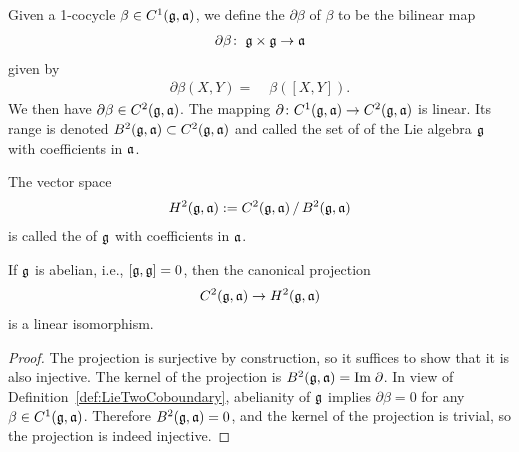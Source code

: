 \begin{definition}
  \label{def:LieTwoCoboundary}
  \leanok
  Given a 1-cocycle $\beta \in C^1(\mathfrak{g}, \mathfrak{a})$, we define the
   $\partial \beta$ of $\beta$ to be the bilinear map
  \begin{align*}
    \partial \beta \colon \; & \mathfrak{g} \times \mathfrak{g} \to \mathfrak{a} \\
  \end{align*}
  given by
  \begin{align*}
    \partial \beta (X, Y) = \; & \beta ([X,Y]) .
  \end{align*}
  We then have $\partial \beta \in C^2(\mathfrak{g},\mathfrak{a})$.
  The mapping $\partial \colon C^1(\mathfrak{g},\mathfrak{a}) \to C^2(\mathfrak{g},\mathfrak{a})$
  is linear. Its range is denoted $B^2(\mathfrak{g},\mathfrak{a}) \subset C^2(\mathfrak{g},\mathfrak{a})$
  and called the set of  of the Lie algebra $\mathfrak{g}$
  with coefficients in $\mathfrak{a}$.
\end{definition}

\begin{definition}
  \label{def:LieTwoCohomology}
  \leanok
  The vector space
  \begin{align*}
    H^2(\mathfrak{g},\mathfrak{a}) := C^2(\mathfrak{g},\mathfrak{a}) \, / \, B^2(\mathfrak{g},\mathfrak{a})
  \end{align*}
  is called the  of $\mathfrak{g}$
  with coefficients in $\mathfrak{a}$.
\end{definition}

\begin{lemma}
  \label{lem:LieTwoCohomology_abelian}
  \leanok
  If $\mathfrak{g}$ is abelian, i.e., $[\mathfrak{g},\mathfrak{g}] = 0$, then
  the canonical projection
  \begin{align*}
    C^2(\mathfrak{g},\mathfrak{a}) \to H^2(\mathfrak{g},\mathfrak{a})
  \end{align*}
  is a linear isomorphism.
\end{lemma}
\begin{proof}
  \leanok
  The projection is surjective by construction, so it suffices to show that it is also injective.
  The kernel of the projection is $B^2(\mathfrak{g},\mathfrak{a}) = \mathrm{Im} \; \partial$.
  In view of Definition~\ref{def:LieTwoCoboundary},
  abelianity of $\mathfrak{g}$ implies $\partial \beta = 0$ for any $\beta \in C^1(\mathfrak{g},\mathfrak{a})$.
  Therefore $B^2(\mathfrak{g},\mathfrak{a}) = 0$, and the kernel of the projection is trivial,
  so the projection is indeed injective.
\end{proof}
